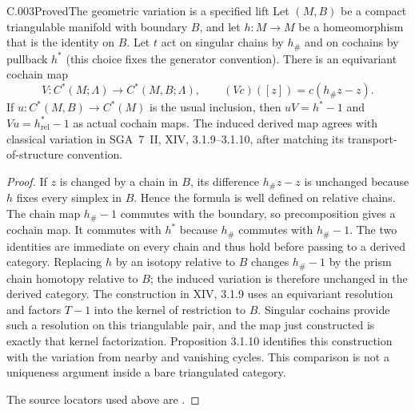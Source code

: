 \begin{saresult}{C.003}{Proved}{The geometric variation is a specified lift}
Let $(M,B)$ be a compact triangulable manifold with boundary $B$, and let
$h:M\to M$ be a homeomorphism that is the identity on $B$.
Let $t$ act on singular chains by $h_\#$ and on cochains by pullback
$h^*$ (this choice fixes the generator convention).
There is an equivariant cochain map
\[
 V:C^*(M;\Lambda)\longrightarrow C^*(M,B;\Lambda),
 \qquad (Vc)([z])=c(h_\#z-z).
\]
If $u:C^*(M,B)\to C^*(M)$ is the usual inclusion, then
$uV=h^*-1$ and $Vu=h^*_{\mathrm{rel}}-1$ as actual cochain maps.
The induced derived map agrees with classical variation in SGA~7~II,
XIV, 3.1.9--3.1.10, after matching its transport-of-structure convention.
\end{saresult}
\begin{proof}
If $z$ is changed by a chain in $B$, its difference $h_\#z-z$ is unchanged
because $h$ fixes every simplex in $B$. Hence the formula is well defined
on relative chains. The chain map $h_\#-1$ commutes with the boundary,
so precomposition gives a cochain map. It commutes with $h^*$ because
$h_\#$ commutes with $h_\#-1$. The two identities are immediate on every
chain and thus hold before passing to a derived category.
Replacing $h$ by an isotopy relative to $B$ changes $h_\#-1$ by the prism
chain homotopy relative to $B$; the induced variation is therefore unchanged
in the derived category. The construction in XIV, 3.1.9 uses an equivariant
resolution and factors $T-1$ into the kernel of restriction to $B$.
Singular cochains provide such a resolution on this triangulable pair,
and the map just constructed is exactly that kernel factorization.
Proposition 3.1.10 identifies this construction with the variation from
nearby and vanishing cycles. This comparison is not a uniqueness argument
inside a bare triangulated category.

The source locators used above are \cite[XIV, 3.1.9--3.1.10, pp.~142--145]{C-sga7ii}.
\end{proof}

